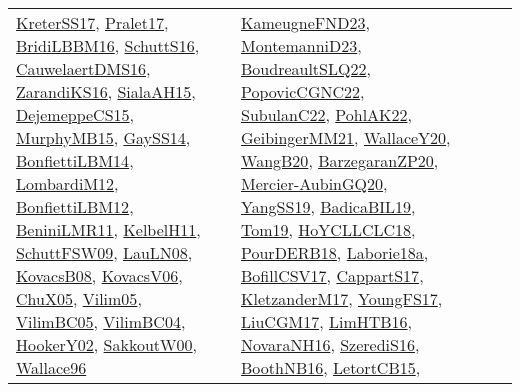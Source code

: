 {\begin{longtable}{lp{3cm}>{\raggedright}p{6cm}>{\raggedright}p{6cm}p{8cm}}
\href{articles/KreterSS17.pdf}{KreterSS17}\cite{KreterSS17}, \href{papers/Pralet17.pdf}{Pralet17}\cite{Pralet17}, \href{papers/BridiLBBM16.pdf}{BridiLBBM16}\cite{BridiLBBM16}, \href{papers/SchuttS16.pdf}{SchuttS16}\cite{SchuttS16}, \href{papers/CauwelaertDMS16.pdf}{CauwelaertDMS16}\cite{CauwelaertDMS16}, \href{articles/ZarandiKS16.pdf}{ZarandiKS16}\cite{ZarandiKS16}, \href{papers/SialaAH15.pdf}{SialaAH15}\cite{SialaAH15}, \href{papers/DejemeppeCS15.pdf}{DejemeppeCS15}\cite{DejemeppeCS15}, \href{papers/MurphyMB15.pdf}{MurphyMB15}\cite{MurphyMB15}, \href{papers/GaySS14.pdf}{GaySS14}\cite{GaySS14}, \href{articles/BonfiettiLBM14.pdf}{BonfiettiLBM14}\cite{BonfiettiLBM14}, \href{articles/LombardiM12.pdf}{LombardiM12}\cite{LombardiM12}, \href{papers/BonfiettiLBM12.pdf}{BonfiettiLBM12}\cite{BonfiettiLBM12}, \href{articles/BeniniLMR11.pdf}{BeniniLMR11}\cite{BeniniLMR11}, \href{articles/KelbelH11.pdf}{KelbelH11}\cite{KelbelH11}, \href{papers/SchuttFSW09.pdf}{SchuttFSW09}\cite{SchuttFSW09}, \href{papers/LauLN08.pdf}{LauLN08}\cite{LauLN08}, \href{articles/KovacsB08.pdf}{KovacsB08}\cite{KovacsB08}, \href{papers/KovacsV06.pdf}{KovacsV06}\cite{KovacsV06}, \href{papers/ChuX05.pdf}{ChuX05}\cite{ChuX05}, \href{papers/Vilim05.pdf}{Vilim05}\cite{Vilim05}, \href{articles/VilimBC05.pdf}{VilimBC05}\cite{VilimBC05}, \href{papers/VilimBC04.pdf}{VilimBC04}\cite{VilimBC04}, \href{papers/HookerY02.pdf}{HookerY02}\cite{HookerY02}, \href{articles/SakkoutW00.pdf}{SakkoutW00}\cite{SakkoutW00}, \href{articles/Wallace96.pdf}{Wallace96}\cite{Wallace96} & \href{papers/KameugneFND23.pdf}{KameugneFND23}\cite{KameugneFND23}, \href{articles/MontemanniD23.pdf}{MontemanniD23}\cite{MontemanniD23}, \href{papers/BoudreaultSLQ22.pdf}{BoudreaultSLQ22}\cite{BoudreaultSLQ22}, \href{papers/PopovicCGNC22.pdf}{PopovicCGNC22}\cite{PopovicCGNC22}, \href{articles/SubulanC22.pdf}{SubulanC22}\cite{SubulanC22}, \href{articles/PohlAK22.pdf}{PohlAK22}\cite{PohlAK22}, \href{papers/GeibingerMM21.pdf}{GeibingerMM21}\cite{GeibingerMM21}, \href{articles/WallaceY20.pdf}{WallaceY20}\cite{WallaceY20}, \href{papers/WangB20.pdf}{WangB20}\cite{WangB20}, \href{papers/BarzegaranZP20.pdf}{BarzegaranZP20}\cite{BarzegaranZP20}, \href{papers/Mercier-AubinGQ20.pdf}{Mercier-AubinGQ20}\cite{Mercier-AubinGQ20}, \href{papers/YangSS19.pdf}{YangSS19}\cite{YangSS19}, \href{papers/BadicaBIL19.pdf}{BadicaBIL19}\cite{BadicaBIL19}, \href{papers/Tom19.pdf}{Tom19}\cite{Tom19}, \href{papers/HoYCLLCLC18.pdf}{HoYCLLCLC18}\cite{HoYCLLCLC18}, \href{articles/PourDERB18.pdf}{PourDERB18}\cite{PourDERB18}, \href{papers/Laborie18a.pdf}{Laborie18a}\cite{Laborie18a}, \href{papers/BofillCSV17.pdf}{BofillCSV17}\cite{BofillCSV17}, \href{papers/CappartS17.pdf}{CappartS17}\cite{CappartS17}, \href{papers/KletzanderM17.pdf}{KletzanderM17}\cite{KletzanderM17}, \href{papers/YoungFS17.pdf}{YoungFS17}\cite{YoungFS17}, \href{papers/LiuCGM17.pdf}{LiuCGM17}\cite{LiuCGM17}, \href{papers/LimHTB16.pdf}{LimHTB16}\cite{LimHTB16}, \href{articles/NovaraNH16.pdf}{NovaraNH16}\cite{NovaraNH16}, \href{papers/SzerediS16.pdf}{SzerediS16}\cite{SzerediS16}, \href{papers/BoothNB16.pdf}{BoothNB16}\cite{BoothNB16}, \href{articles/LetortCB15.pdf}{LetortCB15}\cite{LetortCB15}, 
\end{longtable}}
